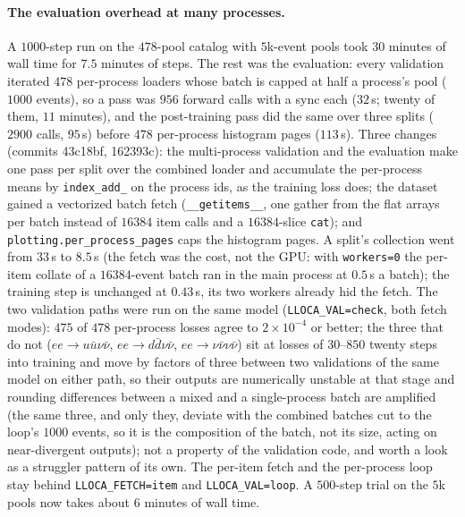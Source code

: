\documentclass[11pt]{article}
\newcommand{\code}[1]{\texttt{#1}}
\begin{document}
\paragraph{The evaluation overhead at many processes.} A $1000$-step run on the
$478$-pool catalog with $5$k-event pools took $30$ minutes of wall time for $7.5$ minutes of
steps. The rest was the evaluation: every validation iterated $478$ per-process loaders whose
batch is capped at half a process's pool ($1000$ events), so a pass was $956$ forward calls
with a sync each ($32$\,s; twenty of them, $11$ minutes), and the post-training pass did the
same over three splits ($2900$ calls, $95$\,s) before $478$ per-process histogram pages
($113$\,s). Three changes (commits 43c18bf, 162393c): the multi-process validation and the
evaluation make one pass per split over the combined loader and accumulate the per-process
means by \code{index\_add\_} on the process ids, as the training loss does; the dataset
gained a vectorized batch fetch (\code{\_\_getitems\_\_}, one gather from the flat arrays per
batch instead of $16384$ item calls and a $16384$-slice \code{cat}); and
\code{plotting.per\_process\_pages} caps the histogram pages. A split's collection went from
$33$\,s to $8.5$\,s (the fetch was the cost, not the GPU: with \code{workers=0} the
per-item collate of a $16384$-event batch ran in the main process at $0.5$\,s a batch); the
training step is unchanged at $0.43$\,s, its two workers already hid the fetch. The two
validation paths were run on the same model (\code{LLOCA\_VAL=check}, both fetch modes): $475$
of $478$ per-process losses agree to $2\times10^{-4}$ or better; the three that do not
($ee\to u\bar u\nu\bar\nu$, $ee\to d\bar d\nu\bar\nu$, $ee\to\nu\bar\nu\nu\bar\nu$) sit at losses of
$30$--$850$ twenty steps into training and move by factors of three between two validations
of the same model on either path, so their outputs are numerically unstable at that stage
and rounding differences between a mixed and a single-process batch are amplified (the
same three, and only they, deviate with the combined batches cut to the loop's $1000$
events, so it is the composition of the batch, not its size, acting on near-divergent
outputs); not a property of the validation code, and worth a look as a struggler pattern
of its own. The
per-item fetch and the per-process loop stay behind \code{LLOCA\_FETCH=item} and
\code{LLOCA\_VAL=loop}. A $500$-step trial on the $5$k pools now takes about $6$ minutes of
wall time.
\end{document}
